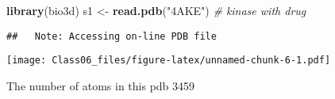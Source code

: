 \documentclass[]{article}
\newenvironment{Shaded}{\begin{snugshade}}{\end{snugshade}}
\newcommand{\KeywordTok}[1]{\textcolor[rgb]{0.13,0.29,0.53}{\textbf{#1}}}
\newcommand{\DataTypeTok}[1]{\textcolor[rgb]{0.13,0.29,0.53}{#1}}
\newcommand{\StringTok}[1]{\textcolor[rgb]{0.31,0.60,0.02}{#1}}
\newcommand{\CommentTok}[1]{\textcolor[rgb]{0.56,0.35,0.01}{\textit{#1}}}
\newcommand{\OperatorTok}[1]{\textcolor[rgb]{0.81,0.36,0.00}{\textbf{#1}}}
\newcommand{\NormalTok}[1]{#1}
\begin{document}
\begin{Shaded}
\begin{Highlighting}[]
\KeywordTok{library}\NormalTok{(bio3d)}
\NormalTok{s1 <-}\StringTok{ }\KeywordTok{read.pdb}\NormalTok{(}\StringTok{"4AKE"}\NormalTok{) }\CommentTok{# kinase with drug}
\end{Highlighting}
\end{Shaded}

\begin{verbatim}
##   Note: Accessing on-line PDB file
\end{verbatim}

\begin{Shaded}
\end{Shaded}

\texttt{[image: Class06\_files/figure-latex/unnamed-chunk-6-1.pdf]}

The number of atoms in this pdb 3459
\end{document}
